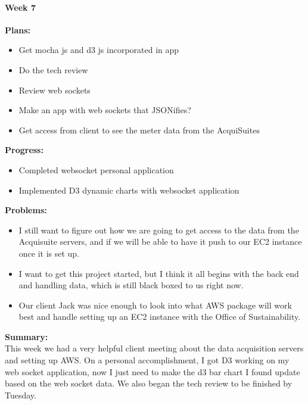 \paragraph{Week 7}
\begin{adjustwidth}{2.5em}{0pt}
    \vspace{-0.5cm}\textbf{Plans:}
    \vspace{-0.5cm}
    \begin{itemize}
        \item Get mocha js and d3 js incorporated in app
        \item Do the tech review
        \item Review web sockets
        \item Make an app with web sockets that JSONifies?
        \item Get access from client to see the meter data from the AcquiSuites
    \end{itemize} 
    \vspace{-0.3cm}\textbf{Progress:}
    \vspace{-0.5cm}
    \begin{itemize}
        \item Completed websocket personal application
        \item Implemented D3 dynamic charts with websocket application
    \end{itemize} 
    \vspace{-0.3cm}\textbf{Problems:}
    \vspace{-0.5cm}
    \begin{itemize}
        \item I still want to figure out how we are going to get access to the data from the Acquisuite servers, and if we will be able to have it push to our EC2 instance once it is set up. 
        \item I want to get this project started, but I think it all begins with the back end and handling data, which is still black boxed to us right now.
        \item Our client Jack was nice enough to look into what AWS package will work best and handle setting up an EC2 instance with the Office of Sustainability.
    \end{itemize}  
    \vspace{-0.3cm}\noindent\textbf{Summary:}\\
    \noindent This week we had a very helpful client meeting about the data acquisition servers and setting up AWS. On a personal accomplishment, I got D3 working on my web socket application, now I just need to make the d3 bar chart I found update based on the web socket data. We also began the tech review to be finished by Tuesday. 
\end{adjustwidth} 
